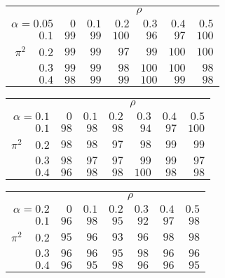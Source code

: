 \begin{tabular}{r|rrrrrr}
\hline\hline
 &\multicolumn{6}{c}{$\rho$} \\ 
 $\alpha = 0.05$ & $0$ & $0.1$ & $0.2$ & $0.3$ & $0.4$ & $0.5$ \\ 
 \hline$0.1$ & $ 99$ & $ 99$ & $100$ & $ 96$ & $ 97$ & $100$\\ 
$\pi^2\;\;\;$ $0.2$ & $ 99$ & $ 99$ & $ 97$ & $ 99$ & $100$ & $100$\\ 
$0.3$ & $ 99$ & $ 99$ & $ 98$ & $100$ & $100$ & $ 98$\\ 
$0.4$ & $ 98$ & $ 99$ & $ 99$ & $100$ & $ 99$ & $ 98$\\ 
 \hline 
 \end{tabular}
 
 \vspace{2em} 
 
\begin{tabular}{r|rrrrrr}
\hline\hline
 &\multicolumn{6}{c}{$\rho$} \\ 
 $\alpha = 0.1$ & $0$ & $0.1$ & $0.2$ & $0.3$ & $0.4$ & $0.5$ \\ 
 \hline$0.1$ & $ 98$ & $ 98$ & $ 98$ & $ 94$ & $ 97$ & $100$\\ 
$\pi^2\;\;\;$ $0.2$ & $ 98$ & $ 98$ & $ 97$ & $ 98$ & $ 99$ & $ 99$\\ 
$0.3$ & $ 98$ & $ 97$ & $ 97$ & $ 99$ & $ 99$ & $ 97$\\ 
$0.4$ & $ 96$ & $ 98$ & $ 98$ & $100$ & $ 98$ & $ 98$\\ 
 \hline 
 \end{tabular}
 
 \vspace{2em} 
 
\begin{tabular}{r|rrrrrr}
\hline\hline
 &\multicolumn{6}{c}{$\rho$} \\ 
 $\alpha = 0.2$ & $0$ & $0.1$ & $0.2$ & $0.3$ & $0.4$ & $0.5$ \\ 
 \hline$0.1$ & $96$ & $98$ & $95$ & $92$ & $97$ & $98$\\ 
$\pi^2\;\;\;$ $0.2$ & $95$ & $96$ & $93$ & $96$ & $98$ & $98$\\ 
$0.3$ & $96$ & $96$ & $95$ & $98$ & $96$ & $96$\\ 
$0.4$ & $96$ & $95$ & $98$ & $96$ & $96$ & $95$\\ 
 \hline 
 \end{tabular}